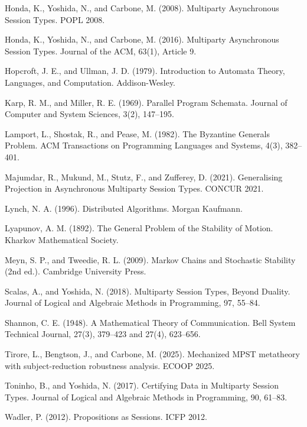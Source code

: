 \documentclass[a4paper,10pt,twocolumn,english]{article}
\numberwithin{equation}{section}
\theoremstyle{paperdef}
\theoremstyle{paperplain}
\theoremstyle{paperdef}
\theoremstyle{paperremark}
\newenvironment{citelist}{%
  \begin{list}{}{%
    \setlength{\leftmargin}{1.25em}%
    \setlength{\itemindent}{-1.25em}%
    \setlength{\itemsep}{2pt}%
    \setlength{\parsep}{0pt}%
    \setlength{\topsep}{3pt}}%
}{\end{list}}
\begin{document}
\begin{citelist}
	\item Honda, K., Yoshida, N., and Carbone, M. (2008). Multiparty Asynchronous Session Types. POPL 2008.
	\item Honda, K., Yoshida, N., and Carbone, M. (2016). Multiparty Asynchronous Session Types. Journal of the ACM, 63(1), Article 9.
	\item Hopcroft, J. E., and Ullman, J. D. (1979). Introduction to Automata Theory, Languages, and Computation. Addison-Wesley.
	\item Karp, R. M., and Miller, R. E. (1969). Parallel Program Schemata. Journal of Computer and System Sciences, 3(2), 147--195.
	\item Lamport, L., Shostak, R., and Pease, M. (1982). The Byzantine Generals Problem. ACM Transactions on Programming Languages and Systems, 4(3), 382--401.
	\item Majumdar, R., Mukund, M., Stutz, F., and Zufferey, D. (2021). Generalising Projection in Asynchronous Multiparty Session Types. CONCUR 2021.
	\item Lynch, N. A. (1996). Distributed Algorithms. Morgan Kaufmann.
	\item Lyapunov, A. M. (1892). The General Problem of the Stability of Motion. Kharkov Mathematical Society.
	\item Meyn, S. P., and Tweedie, R. L. (2009). Markov Chains and Stochastic Stability (2nd ed.). Cambridge University Press.
	\item Scalas, A., and Yoshida, N. (2018). Multiparty Session Types, Beyond Duality. Journal of Logical and Algebraic Methods in Programming, 97, 55--84.
	\item Shannon, C. E. (1948). A Mathematical Theory of Communication. Bell System Technical Journal, 27(3), 379--423 and 27(4), 623--656.
	\item Tirore, L., Bengtson, J., and Carbone, M. (2025). Mechanized MPST metatheory with subject-reduction robustness analysis. ECOOP 2025.
	\item Toninho, B., and Yoshida, N. (2017). Certifying Data in Multiparty Session Types. Journal of Logical and Algebraic Methods in Programming, 90, 61--83.
	\item Wadler, P. (2012). Propositions as Sessions. ICFP 2012.
\end{citelist}

\clearpage
\appendix
{}
\vspace{1em}
\end{document}
